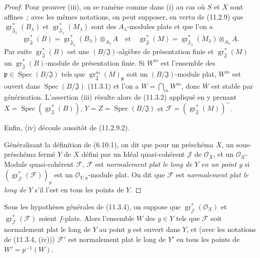 \begin{proof}
Pour prouver (iii), on se ramène comme dans (i) au cas où $S$ et $X$ sont
affines~; avec les mêmes notations, on peut supposer, en vertu de (11.2.9) que
$\operatorname{gr}_{\mathfrak J_\lambda}^*(B_\lambda)$ et
$\operatorname{gr}_{\mathfrak J_\lambda}^*(M_\lambda)$ sont des
$A_\lambda$-modules plats et que l'on a
\[
\operatorname{gr}_{\mathfrak J}^*(B)
=\operatorname{gr}_{\mathfrak J_\lambda}^*(B_\lambda)\otimes_{A_\lambda}A
\quad\text{et}\quad
\operatorname{gr}_{\mathfrak J}^*(M)
=\operatorname{gr}_{\mathfrak J_\lambda}^*(M_\lambda)\otimes_{A_\lambda}A.
\]
Par suite $\operatorname{gr}_{\mathfrak J}^*(B)$ est une
$(B/\mathfrak J)$-algèbre de présentation finie et
$\operatorname{gr}_{\mathfrak J}^*(M)$ un
$\operatorname{gr}_{\mathfrak J}^*(B)$-module de présentation finie. Si $W^m$
est l'ensemble des $\mathfrak p\in\operatorname{Spec}(B/\mathfrak J)$ tels que
$\operatorname{gr}_{\mathfrak J}^m(M)_\mathfrak p$ soit un
$(B/\mathfrak J)$-module plat, $W^m$ est ouvert dans
$\operatorname{Spec}(B/\mathfrak J)$ (11.3.1) et l'on a
$W=\bigcap_mW^m$, donc $W$ est stable par générisation. L'assertion (iii)
résulte alors de (11.3.2) appliqué en y prenant
$X=\operatorname{Spec}(\operatorname{gr}_{\mathfrak J}^*(B))$,
$Y=Z=\operatorname{Spec}(B/\mathfrak J)$ et
$\mathcal F=(\operatorname{gr}_{\mathfrak J}^*(M))^{\sim}$.

Enfin, (iv) découle aussitôt de (11.2.9.2).

Généralisant la définition de (6.10.1), on dit que pour un préschéma $X$, un
sous-préschéma fermé $Y$ de $X$ défini par un Idéal quasi-cohérent $\mathcal J$
de $\mathcal O_X$, et un $\mathcal O_X$-Module quasi-cohérent $\mathcal F$,
$\mathcal F$ est \emph{normalement plat le long de $Y$ en un point $y$} si
$(\operatorname{gr}_{\mathcal J}^*(\mathcal F))_y$ est un
$\mathcal O_{Y,y}$-module plat. On dit que $\mathcal F$ est
\emph{normalement plat le long de $Y$} s'il l'est en tous les points de $Y$.
\end{proof}

\begin{corollary}[11.3.5]
\label{IV.11.3.5-fr}
Sous les hypothèses générales de (11.3.4), on suppose que
$\operatorname{gr}_{\mathcal J}^*(\mathcal O_X)$ et
$\operatorname{gr}_{\mathcal J}^*(\mathcal F)$ soient $f$-plats. Alors
l'ensemble $W$ des $y\in Y$ tels que $\mathcal F$ soit normalement plat le long
de $Y$ au point $y$ est ouvert dans $Y$, et (avec les notations de
(11.3.4, (iv))) $\mathcal F'$ est normalement plat le long de $Y'$ en tous les
points de $W'=p^{-1}(W)$.
\end{corollary}


